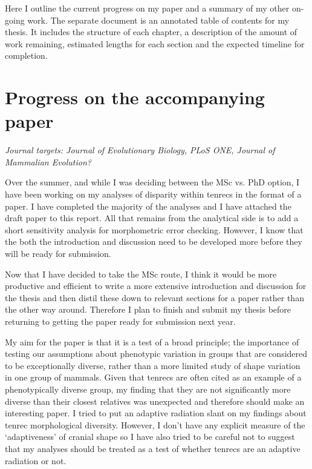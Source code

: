 \documentclass[12pt,a4paper]{article}
\begin{document}
	Here I outline the current progress on my paper and a summary of my other on-going work. The separate document is an annotated table of contents for my thesis. It includes the structure of each chapter, a description of the amount of work remaining, estimated lengths for each section and the expected timeline for completion.  


\section{Progress on the accompanying paper}

	\textit{Journal targets: Journal of Evolutionary Biology, PLoS ONE, Journal of Mammalian Evolution?} 
\bigskip

	Over the summer, and while I was deciding between the MSc vs. PhD option, I have been working on my analyses of disparity within tenrecs in the format of a paper. I have completed the majority of the analyses and I have attached the draft paper to this report. All that remains from the analytical side is to add a short sensitivity analysis for morphometric error checking.  However, I know that the both the introduction and discussion need to be developed more before they will be ready for submission.
	
	Now that I have decided to take the MSc route, I think it would be more productive and efficient to write a more extensive introduction and discussion for the thesis and then distil these down to relevant sections for a paper rather than the other way around. Therefore I plan to finish and submit my thesis before returning to getting the paper ready for submission next year. 

	My aim for the paper is that it is a test of a broad principle; the importance of testing our assumptions about phenotypic variation in groups that are considered to be exceptionally diverse, rather than a more limited study of shape variation in one group of mammals. Given that tenrecs are often cited as an example of a phenotypically diverse group, my finding that they are not significantly more diverse than their closest relatives was unexpected and therefore should make an interesting paper. I tried to put an adaptive radiation slant on my findings about tenrec morphological diversity. However, I don't have any explicit measure of the `adaptiveness' of cranial shape so I have also tried to be careful not to suggest that my analyses should be treated as a test of whether tenrecs are an adaptive radiation or not.
	
\end{document}
